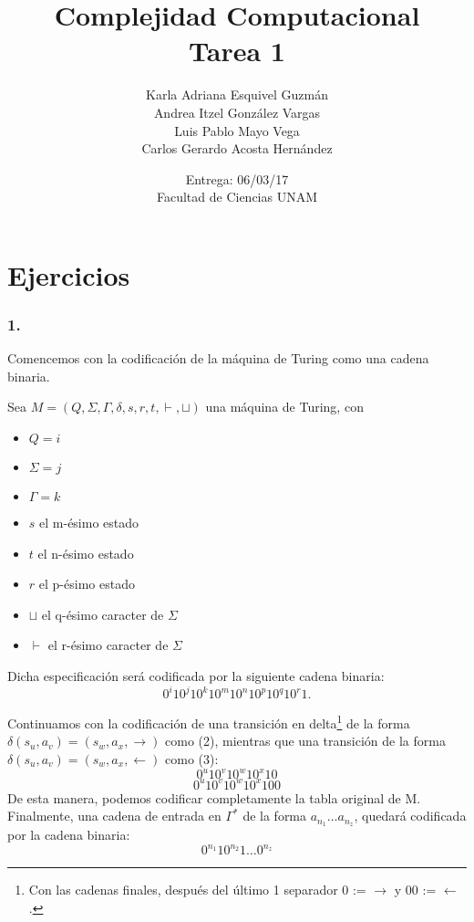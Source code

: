 \documentclass[12pt]{article}
\title{Complejidad Computacional \\ Tarea 1}
\author{Karla Adriana Esquivel Guzmán \\ Andrea Itzel González Vargas\\ Luis Pablo Mayo Vega \\ Carlos Gerardo Acosta Hernández}
\date{Entrega: 06/03/17 \\ Facultad de Ciencias UNAM}
\begin{document}
\maketitle
\section*{Ejercicios}
\subsubsection*{1.}
Comencemos con la codificación de la máquina de Turing como una cadena binaria.

Sea $M = (Q,\Sigma,\Gamma,\delta,s,r,t,\vdash,\sqcup)$ una máquina de Turing, con
\begin{itemize}
\item $Q = i$
\item $\Sigma = j$
\item $\Gamma = k$
\item $s$ el m-ésimo estado
\item $t$ el n-ésimo estado
\item $r$ el p-ésimo estado
\item $\sqcup$ el q-ésimo caracter de $\Sigma$
\item $\vdash$ el r-ésimo caracter de $\Sigma$ 
\end{itemize}
Dicha especificación será codificada por la siguiente cadena binaria:\\
\begin{equation}
  0^i10^j10^k10^m10^n10^p10^q10^r1.
\end{equation}

Continuamos con la codificación de una transición en delta\footnote{Con las cadenas finales, después del último 1 separador 
0 := $\rightarrow$ y 00 := $\leftarrow$.} de la forma $\delta(s_u,a_v) = (s_w,a_x,\rightarrow)$ como (2),
mientras que una transición de la forma $\delta(s_u,a_v) = (s_w,a_x,\leftarrow)$ como (3):\\
\begin{equation}
  0^u10^v10^w10^x10
\end{equation}
\begin{equation}
  0^u10^v10^w10^x100  
\end{equation}
De esta manera, podemos codificar completamente la tabla original de M.\\
Finalmente, una cadena de entrada en $\Gamma^*$ de la forma $a_{n_1} \dots a_{n_z}$, quedará codificada por la cadena binaria:\\
\begin{equation}
0^{n_1}10^{n_2}1\dots0^{n_z}
\end{equation}
\end{document}
